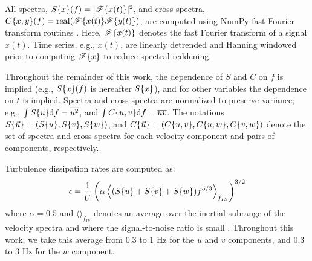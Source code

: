 All spectra, $S\{x\}(f)=|\mathscr{F}\{x(t)\}|^2$, and cross spectra, $C\{x,y\}(f)=\mathrm{real}(\mathscr{F}\{x(t)\}\mathscr{F}\{y(t)\})$, are computed using NumPy fast Fourier transform routines \cite[]{Walt++2011}. Here, $\mathscr{F}\{x(t)\}$ denotes the fast Fourier transform of a signal $x(t)$. Time series, e.g., $x(t)$, are linearly detrended and Hanning windowed prior to computing $\mathscr{F}\{x\}$ to reduce spectral reddening.  

Throughout the remainder of this work, the dependence of $S$ and $C$ on $f$ is implied (e.g., $S\{x\}(f)$ is hereafter $S\{x\}$), and for other variables the dependence on $t$ is implied. Spectra and cross spectra are normalized to preserve variance; e.g., $\int S\{u\}\mathrm{d}f = \overline{u^2}$, and  $\int C\{u,v\}\mathrm{d}f = \overline{uv}$. The notations $S\{\vec{u}\}=(S\{u\}, S\{v\}, S\{w\})$, and $C\{\vec{u}\} = (C\{u,v\}, C\{u,w\}, C\{v,w\} )$ denote the set of spectra and cross spectra for each velocity component and pairs of components, respectively.

Turbulence dissipation rates are computed as:
\begin{align}
  \epsilon = \frac{1}{\bar{U}}\left(\alpha\left\langle(S\{u\}+S\{v\}+S\{w\})f^{5/3}\right\rangle_{f_{IS}}\right)^{3/2}
\end{align}
where  $\alpha=0.5$ and $\langle\rangle_{f_{IS}}$ denotes an average over the inertial subrange of the velocity spectra and where the signal-to-noise ratio is small \cite[]{Lumley+Terray1983,Sreenivasan1995}. Throughout this work, we take this average from 0.3 to 1 Hz for the $u$ and $v$ components, and 0.3 to 3 Hz for the $w$ component.

